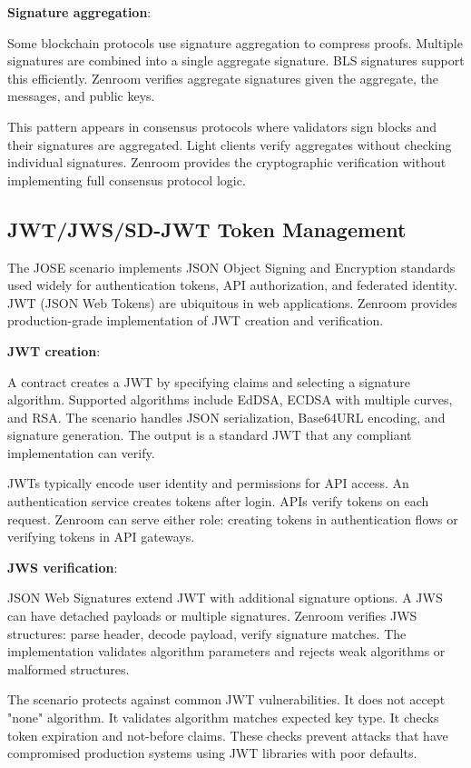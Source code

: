 \textbf{Signature aggregation}:

Some blockchain protocols use signature aggregation to compress
proofs. Multiple signatures are combined into a single aggregate
signature. BLS signatures support this efficiently. Zenroom verifies
aggregate signatures given the aggregate, the messages, and public
keys.

This pattern appears in consensus protocols where validators sign
blocks and their signatures are aggregated. Light clients verify
aggregates without checking individual signatures. Zenroom provides
the cryptographic verification without implementing full consensus
protocol logic.

\subsection{JWT/JWS/SD-JWT Token Management}

The JOSE scenario implements JSON Object Signing and Encryption
standards used widely for authentication tokens, API authorization,
and federated identity. JWT (JSON Web Tokens) are ubiquitous in web
applications. Zenroom provides production-grade implementation of JWT
creation and verification.

\textbf{JWT creation}:

A contract creates a JWT by specifying claims and selecting a
signature algorithm. Supported algorithms include EdDSA, ECDSA with
multiple curves, and RSA. The scenario handles JSON serialization,
Base64URL encoding, and signature generation. The output is a standard
JWT that any compliant implementation can verify.

JWTs typically encode user identity and permissions for API access. An
authentication service creates tokens after login. APIs verify tokens
on each request. Zenroom can serve either role: creating tokens in
authentication flows or verifying tokens in API gateways.

\textbf{JWS verification}:

JSON Web Signatures extend JWT with additional signature options. A
JWS can have detached payloads or multiple signatures. Zenroom
verifies JWS structures: parse header, decode payload, verify
signature matches. The implementation validates algorithm parameters
and rejects weak algorithms or malformed structures.

The scenario protects against common JWT vulnerabilities. It does not
accept "none" algorithm. It validates algorithm matches expected key
type. It checks token expiration and not-before claims. These checks
prevent attacks that have compromised production systems using JWT
libraries with poor defaults.

